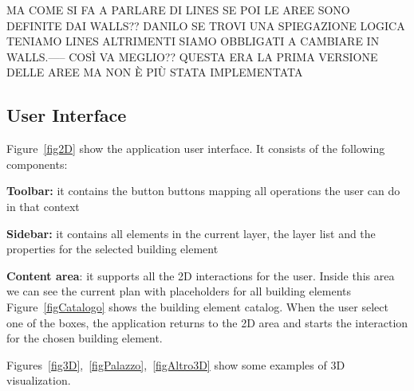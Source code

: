 MA COME SI FA A PARLARE DI LINES SE POI LE AREE SONO DEFINITE DAI WALLS?? DANILO SE TROVI UNA SPIEGAZIONE LOGICA TENIAMO LINES ALTRIMENTI SIAMO OBBLIGATI A CAMBIARE IN WALLS.----- COS\`I VA MEGLIO?? QUESTA ERA LA PRIMA VERSIONE DELLE AREE MA NON \`E PI\`U STATA IMPLEMENTATA


\subsection{User Interface}\label{ssec:ui}

Figure~\ref{fig2D} show the application user interface. It consists of the following components:

\textbf{Toolbar:} it contains the button buttons mapping all operations the user can do in that context

\textbf{Sidebar:} it contains all elements in the current layer, the layer list and the properties for the selected building element

\textbf{Content area}: it supports all the 2D interactions for the user. Inside this area we can see the current plan with placeholders for all building elements\\

Figure~\ref{figCatalogo} shows the building element catalog. When the user select one of the boxes, the application returns to the 2D area and starts the interaction for the chosen building element.

Figures~\ref{fig3D},~\ref{figPalazzo},~\ref{figAltro3D} show some examples of 3D visualization.
